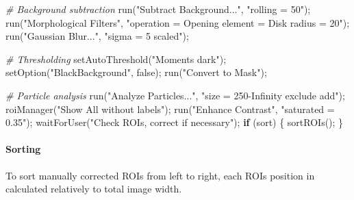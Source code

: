 \documentclass[10pt, b5paper, singlespacinge, twoside]{reedthesis} %
\newenvironment{Shaded}{}{}
\newcommand{\CommentTok}[1]{\textit{#1}}
\newcommand{\ControlFlowTok}[1]{\textbf{#1}}
\newcommand{\FunctionTok}[1]{#1}
\newcommand{\NormalTok}[1]{#1}
\newcommand{\StringTok}[1]{#1}
\theoremstyle{definition}
\theoremstyle{definition}
\theoremstyle{definition}
\theoremstyle{remark}
\begin{document}
\scriptsize
\begin{Shaded}
\begin{Highlighting}[numbers=left,,]
\CommentTok{\# Background subtraction}
    \FunctionTok{run}\NormalTok{(}\StringTok{"Subtract Background..."}\NormalTok{, }\StringTok{"rolling = 50"}\NormalTok{);}
    \FunctionTok{run}\NormalTok{(}\StringTok{"Morphological Filters"}\NormalTok{,}
        \StringTok{"operation = Opening element = Disk radius = 20"}\NormalTok{);}
    \FunctionTok{run}\NormalTok{(}\StringTok{"Gaussian Blur..."}\NormalTok{, }\StringTok{"sigma = 5 scaled"}\NormalTok{);}

\CommentTok{\# Thresholding}
    \FunctionTok{setAutoThreshold}\NormalTok{(}\StringTok{"Moments dark"}\NormalTok{);}
    \FunctionTok{setOption}\NormalTok{(}\StringTok{"BlackBackground"}\NormalTok{, false);}
    \FunctionTok{run}\NormalTok{(}\StringTok{"Convert to Mask"}\NormalTok{);}

\CommentTok{\# Particle analysis}
    \FunctionTok{run}\NormalTok{(}\StringTok{"Analyze Particles..."}\NormalTok{, }\StringTok{"size = 250{-}Infinity exclude add"}\NormalTok{);}
    \FunctionTok{roiManager}\NormalTok{(}\StringTok{"Show All without labels"}\NormalTok{);}
    \FunctionTok{run}\NormalTok{(}\StringTok{"Enhance Contrast"}\NormalTok{, }\StringTok{"saturated = 0.35"}\NormalTok{);}
    \FunctionTok{waitForUser}\NormalTok{(}\StringTok{"Check ROIs, correct if necessary"}\NormalTok{);}
    \ControlFlowTok{if}\NormalTok{ (sort) \{}
        \FunctionTok{sortROIs}\NormalTok{();}
\NormalTok{    \}}
\end{Highlighting}
\end{Shaded}
\normalsize

\hypertarget{sorting}{%
\paragraph{Sorting}\label{sorting}}

To sort manually corrected ROIs from left to right, each ROIs position in calculated relatively to total image width.
\end{document}
